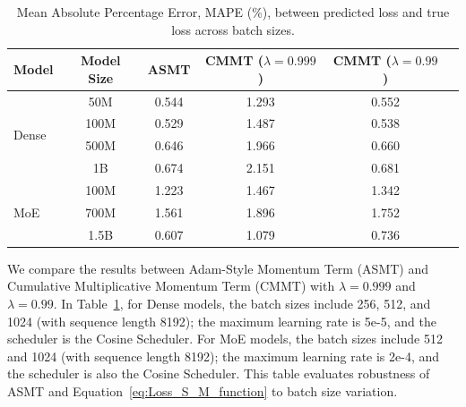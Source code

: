 \documentclass[letterpaper]{article} %
\begin{document}
\begin{table}[ht]
	\centering
	\setlength{\tabcolsep}{3pt}
	\renewcommand{\arraystretch}{1.2}
	\begin{tabular}{lccccc}
		\toprule
		\textbf{Model} & \textbf{Model Size} & \textbf{ASMT} & \makecell{CMMT\\($\lambda=0.999$)} & \makecell{CMMT\\($\lambda=0.99$)} \\
		\midrule
		\multirow{4}{*}{Dense} 
		& 50M   & 0.544 & 1.293 & 0.552\\
		& 100M  & 0.529 & 1.487 & 0.538\\
		& 500M  & 0.646 & 1.966 & 0.660\\
		& 1B    & 0.674 & 2.151 & 0.681\\
		\midrule
		\multirow{4}{*}{MoE} 
		& 100M  & 1.223 & 1.467 & 1.342\\
		& 700M  & 1.561 & 1.896 & 1.752\\
		& 1.5B  & 0.607 & 1.079 & 0.736\\
		\bottomrule
	\end{tabular}
	\caption{Mean Absolute Percentage Error, MAPE (\%), between predicted loss and true loss across batch sizes.}
	\label{tab:mape-results}
\end{table}



We compare the results between Adam-Style Momentum Term (ASMT) and Cumulative Multiplicative Momentum Term (CMMT) with $\lambda = 0.999$ and $\lambda = 0.99$. In Table~\ref{tab:mape-results}, for Dense models, the batch sizes include 256, 512, and 1024 (with sequence length 8192); the maximum learning rate is 5e-5, and the scheduler is the Cosine Scheduler. For MoE models, the batch sizes include 512 and 1024 (with sequence length 8192); the maximum learning rate is 2e-4, and the scheduler is also the Cosine Scheduler. This table evaluates robustness of ASMT and Equation~\ref{eq:Loss_S_M_function} to batch size variation.
\end{document}
